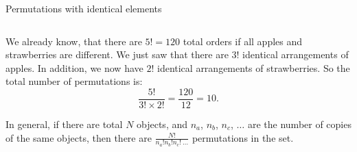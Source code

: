 \documentclass[9pt,aspectratio=169]{beamer}
\begin{document}
\begin{frame}{Permutations with identical elements}
\begin{columns}[T]
\begin{column}{0.5\textwidth}
      {\small
      We already know, that there are $5! = 120$ total orders if all apples and strawberries are different. We just saw that there are $3!$ identical arrangements of apples. In addition, we now have $2!$ identical arrangements of strawberries.  So the total number of permutations is:
      \[
        \frac{5!}{3! \times 2!} = \frac{120}{12} = 10.
      \]}

      \begin{definition}
        In general, if there are total $N$ objects, and $n_a$, $n_b$, $n_c$, $\dots$ are the number of copies of the same objects, then there are 
        $
          \frac{N!}{n_a! n_b! n_c!\ \ldots}
        $
        permutations in the set.
      \end{definition}
    \end{column}
  \end{columns}
\end{frame}
\end{document}

